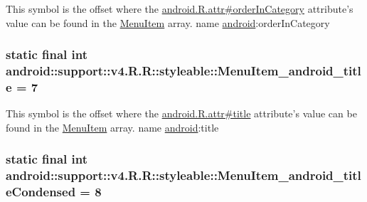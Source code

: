 This symbol is the offset where the \hyperlink{}{android.R.attr\#orderInCategory} attribute's value can be found in the \hyperlink{classandroid_1_1support_1_1v4_1_1_r_1_1styleable_05493a7eeaa2bff09c4fbacbfb671ccc}{MenuItem} array.  name \hyperlink{namespaceandroid}{android}:orderInCategory \hypertarget{classandroid_1_1support_1_1v4_1_1_r_1_1styleable_1723212f5e94f798ff04dbfee2d97cf8}{
\subsubsection[{MenuItem\_\-android\_\-title}]{\setlength{\rightskip}{0pt plus 5cm}static final int android::support::v4.R.R::styleable::MenuItem\_\-android\_\-title = 7}}
\label{classandroid_1_1support_1_1v4_1_1_r_1_1styleable_1723212f5e94f798ff04dbfee2d97cf8}


This symbol is the offset where the \hyperlink{}{android.R.attr\#title} attribute's value can be found in the \hyperlink{classandroid_1_1support_1_1v4_1_1_r_1_1styleable_05493a7eeaa2bff09c4fbacbfb671ccc}{MenuItem} array.  name \hyperlink{namespaceandroid}{android}:title \hypertarget{classandroid_1_1support_1_1v4_1_1_r_1_1styleable_893c55eac75b4f4c10023c8c9326e6ee}{
\subsubsection[{MenuItem\_\-android\_\-titleCondensed}]{\setlength{\rightskip}{0pt plus 5cm}static final int android::support::v4.R.R::styleable::MenuItem\_\-android\_\-titleCondensed = 8}}
\label{classandroid_1_1support_1_1v4_1_1_r_1_1styleable_893c55eac75b4f4c10023c8c9326e6ee}


